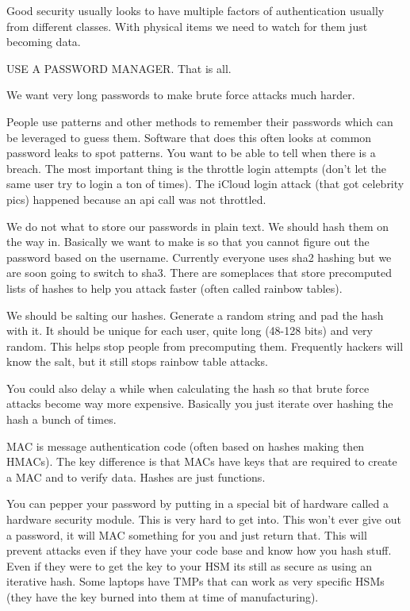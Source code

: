 \documentclass{article}
\begin{document}
\begin{itemizeP}

Good security usually looks to have multiple factors of authentication usually from different classes. With physical items we need to watch for them just becoming data. 


USE A PASSWORD MANAGER. That is all.


We want very long passwords to make brute force attacks much harder.


People use patterns and other methods to remember their passwords which can be leveraged to guess them. Software that does this often looks at common password leaks to spot patterns. You want to be able to tell when there is a breach. The most important thing is the throttle login attempts (don't let the same user try to login a ton of times). The iCloud login attack (that got celebrity pics) happened because an api call was not throttled.




We do not what to store our passwords in plain text. We should hash them on the way in. Basically we want to make is so that you cannot figure out the password based on the username. Currently everyone uses sha2 hashing but we are soon going to switch to sha3. There are someplaces that store precomputed lists of hashes to help you attack faster (often called rainbow tables).


We should be salting our hashes. Generate a random string and pad the hash with it. It should be unique for each user, quite long (48-128 bits) and very random. This helps stop people from precomputing them. Frequently hackers will know the salt, but it still stops rainbow table attacks. 


You could also delay a while when calculating the hash so that brute force attacks become way more expensive. Basically you just iterate over hashing the hash a bunch of times. 


MAC is message authentication code (often based on hashes making then HMACs). The key difference is that MACs have keys that are required to create a MAC and to verify data. Hashes are just functions. 


You can pepper your password by putting in a special bit of hardware called a hardware security module. This is very hard to get into. This won't ever give out a password, it will MAC something for you and just return that. This will prevent attacks even if they have your code base and know how you hash stuff. Even if they were to get the key to your HSM its still as secure as using an iterative hash. Some laptops have TMPs that can work as very specific HSMs (they have the key burned into them at time of manufacturing). 


\end{itemizeP}
\end{document}
